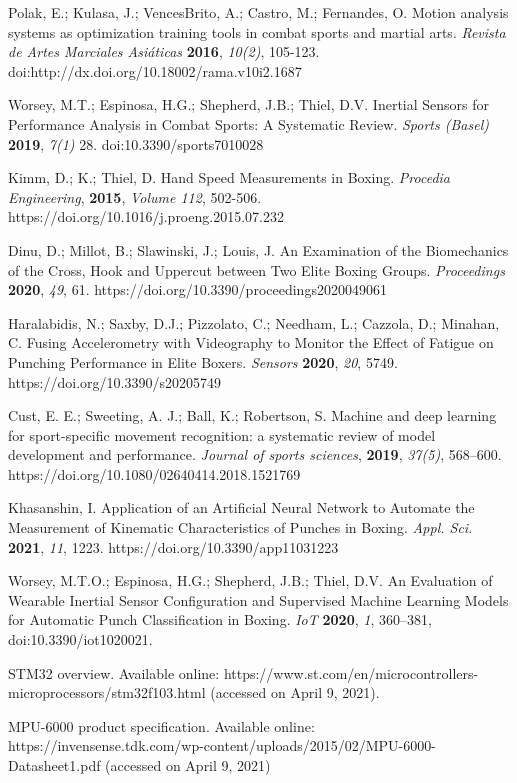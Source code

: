 \documentclass[sport,article,submit,moreauthors,pdftex]{Definitions/mdpi}
\begin{document}
\begin{thebibliography}{999}

Polak, E.; Kulasa, J.; VencesBrito, A.; Castro, M.; Fernandes, O. Motion analysis systems as optimization training tools in combat sports and martial arts. {\em Revista de Artes Marciales Asiáticas} {\bf 2016}, {\em 10(2)}, 105-123. doi:http://dx.doi.org/10.18002/rama.v10i2.1687

Worsey, M.T.; Espinosa, H.G.; Shepherd, J.B.; Thiel, D.V. Inertial Sensors for Performance Analysis in Combat Sports: A Systematic Review. {\em Sports (Basel)} {\bf 2019}, {\em 7(1)} 28. doi:10.3390/sports7010028

Kimm, D.; K.; Thiel, D. Hand Speed Measurements in Boxing. {\em Procedia Engineering}, {\bf 2015}, {\em Volume 112}, 502-506. https://doi.org/10.1016/j.proeng.2015.07.232

Dinu, D.; Millot, B.; Slawinski, J.; Louis, J. An Examination of the Biomechanics of the Cross, Hook and Uppercut between Two Elite Boxing Groups. {\em Proceedings} {\bf 2020}, {\em 49}, 61. https://doi.org/10.3390/proceedings2020049061

Haralabidis, N.; Saxby, D.J.; Pizzolato, C.; Needham, L.; Cazzola, D.; Minahan, C. Fusing Accelerometry with Videography to Monitor the Effect of Fatigue on Punching Performance in Elite Boxers. {\em Sensors} {\bf 2020}, {\em 20}, 5749. https://doi.org/10.3390/s20205749

Cust, E. E.; Sweeting, A. J.; Ball, K.; Robertson, S. Machine and deep learning for sport-specific movement recognition: a systematic review of model development and performance. {\em Journal of sports sciences}, {\bf 2019}, {\em 37(5)}, 568–600. https://doi.org/10.1080/02640414.2018.1521769

Khasanshin, I. Application of an Artificial Neural Network to Automate the Measurement of Kinematic Characteristics of Punches in Boxing. {\em Appl. Sci}. {\bf 2021}, {\em 11}, 1223. https://doi.org/10.3390/app11031223

Worsey, M.T.O.; Espinosa, H.G.; Shepherd, J.B.; Thiel, D.V. An Evaluation of Wearable Inertial Sensor Configuration and Supervised Machine Learning Models for Automatic Punch Classification in Boxing. {\em IoT} {\bf 2020}, {\em 1}, 360–381, doi:10.3390/iot1020021.

STM32 overview. Available online: https://www.st.com/en/microcontrollers-microprocessors/stm32f103.html (accessed on April 9, 2021).

MPU-6000 product specification. Available online: https://invensense.tdk.com/wp-content/uploads/2015/02/MPU-6000-Datasheet1.pdf (accessed on April 9, 2021)

\end{thebibliography}

\end{document}
